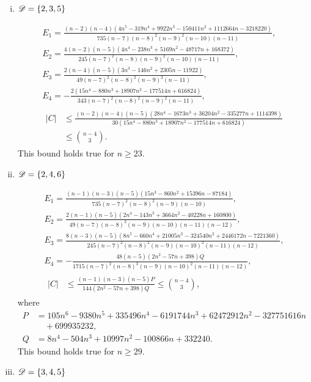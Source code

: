\documentclass{amsart}
\begin{document}
{\begin{enumerate}[(i)]
\item $\mathscr{D}=\{2,3,5\}$

\begin{gather*}
E_1=\frac{(n-2)(n-4)\left(4n^5-319n^4+9922n^3-150411n^2+1112664n-3218220\right)}{735(n-7)(n-8)^2(n-9)^2(n-10)(n-11)},\\ E_2=\frac{4(n-2)(n-5)\left(4n^4-238n^3+5169n^2-48717n+168372\right)}{245(n-7)^2(n-8)(n-9)^2(n-10)(n-11)},\\ 
E_3=\frac{2(n-4)(n-5)\left(3n^3-146n^2+2305n-11922\right)}{49(n-7)^2(n-8)^2(n-9)^2(n-11)},\\
E_4=-\frac{2\left(15n^4-880n^3+18907n^2-177514n+616824\right)}{343(n-7)^2(n-8)^2(n-9)^2(n-11)},\\
\begin{aligned}
|C| &\le \frac{(n-2)(n-4)(n-5)\left(28n^4-1673n^3+36204n^2-335277 n+1114398\right)}{30\left(15n^4-880n^3+18907n^2-177514n+616824\right)}\\
&\leq \binom{n-4}{3}.
\end{aligned}
\end{gather*}
This bound holds true for $n\ge 23.$

\item $\mathscr{D}=\{2,4,6\}$

\begin{gather*}
E_1=\frac{(n-1)(n-3)(n-5)\left(15n^3-860n^2+15396n-87184\right)}{735(n-7)^2(n-8)^2(n-9)(n-10)},\\ E_2=\frac{2(n-1)(n-5)\left(2n^4-143n^3+3664n^2-40228n+160800\right)}{49(n-7)(n-8)^2(n-9)(n-10)(n-11)(n-12)},\\ 
E_3=\frac{8(n-3)(n-5)\left(8n^5-660n^4+21005n^3-324540n^2+2446172n-7221360\right)}{245(n-7)^2(n-8)^2(n-9)(n-10)^2(n-11)(n-12)},\\
E_4=-\frac{48(n-5)\left(2n^2-57n+398\right)Q}{1715(n-7)^2(n-8)^3(n-9)(n-10)^2(n-11)(n-12)},\\
\begin{aligned}
|C| &\le \frac{(n-1)(n-3)(n-5)P}{144\left(2n^2-57n+398\right)Q}
\leq \binom{n-4}{3},
\end{aligned}
\end{gather*}
where
\begin{align*}
P &= 105n^6-9380n^5+335496n^4-6191744n^3+62472912n^2-327751616n\\
& \quad +699935232,\\
Q &= 8n^4-504n^3+10997n^2-100866n+332240.
\end{align*}
This bound holds true for $n\ge 29.$

\item $\mathscr{D}=\{3,4,5\}$


\end{enumerate}}
\end{document}
